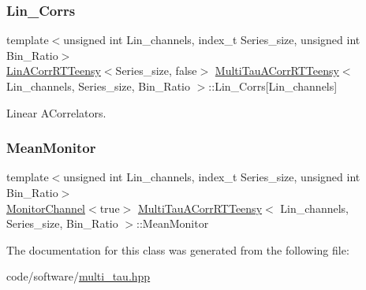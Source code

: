 \subsubsection{\texorpdfstring{Lin\+\_\+\+Corrs}{Lin\_Corrs}}
{\footnotesize\ttfamily template$<$unsigned int Lin\+\_\+channels, index\+\_\+t Series\+\_\+size, unsigned int Bin\+\_\+\+Ratio$>$ \\
\hyperlink{classLinACorrRTTeensy}{Lin\+A\+Corr\+R\+T\+Teensy}$<$Series\+\_\+size, false$>$ \hyperlink{classMultiTauACorrRTTeensy}{Multi\+Tau\+A\+Corr\+R\+T\+Teensy}$<$ Lin\+\_\+channels, Series\+\_\+size, Bin\+\_\+\+Ratio $>$\+::Lin\+\_\+\+Corrs\mbox{[}Lin\+\_\+channels\mbox{]}\hspace{0.3cm}{\ttfamily [private]}}



Linear A\+Correlators. 

\mbox{\label{classMultiTauACorrRTTeensy_a88f0486f59451fb97a787741c80badf9}} 
\subsubsection{\texorpdfstring{Mean\+Monitor}{MeanMonitor}}
{\footnotesize\ttfamily template$<$unsigned int Lin\+\_\+channels, index\+\_\+t Series\+\_\+size, unsigned int Bin\+\_\+\+Ratio$>$ \\
\hyperlink{classMonitorChannel}{Monitor\+Channel}$<$true$>$ \hyperlink{classMultiTauACorrRTTeensy}{Multi\+Tau\+A\+Corr\+R\+T\+Teensy}$<$ Lin\+\_\+channels, Series\+\_\+size, Bin\+\_\+\+Ratio $>$\+::Mean\+Monitor}



The documentation for this class was generated from the following file\+:\begin{DoxyCompactItemize}
\item 
code/software/\hyperlink{multi__tau_8hpp}{multi\+\_\+tau.\+hpp}\end{DoxyCompactItemize}
